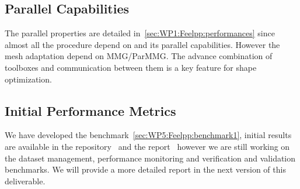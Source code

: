 \subsection{Parallel Capabilities}
\label{sec:WP5:Feelpp:performances}
 
The parallel properties are detailed in~\cref{sec:WP1:Feelpp:performances} since almost all the procedure depend on \Feelpp and its parallel capabilities.
However the mesh adaptation depend on MMG/ParMMG.
The advance combination of toolboxes and communication between them is a key feature for shape optimization. 

\subsection{Initial Performance Metrics}
\label{sec:WP5:Feelpp:metrics}

We have developed the benchmark~\cref{sec:WP5:Feelpp:benchmark1}, initial results are available in the repository~\cite{Palazollo_Feel_Shape_Optimization} and the report~\cite{palazzolo2023shape} however we are still working on the dataset management, performance monitoring and verification and validation benchmarks.
We will provide a more detailed report in the next version of this deliverable.

\iffalse


This section provides a summary of initial performance benchmarks performed in the context of WP5. It ensures reproducibility by detailing input/output datasets, benchmarking tools, and the results. All data should be publicly available, ideally with a DOI for future reference.

\begin{itemize}
    \item \textbf{Overall Performance:} Summarize the software's computational performance, energy efficiency, and scalability results across different architectures (e.g., CPU, GPU, hybrid systems).
    \item \textbf{Input/Output Dataset:} a json file containing the description of the shape optimization problem and a json and partition mesh file for each toolbox used in the optimization problem.
    \item \textbf{open-data Access:} the dataset is available at \url{https://github.com/feelpp/feelpp-shapo}
    \item \textbf{Challenges:} Robust scalable solution strategies for the different steps of the shape optimization problem. I/O and memory management are also critical.
    \item \textbf{Future Improvements:} Implement more efficient solution strategies for the shape optimization problem. Optimize I/O and memory management for large-scale simulations.
\end{itemize}
\fi


